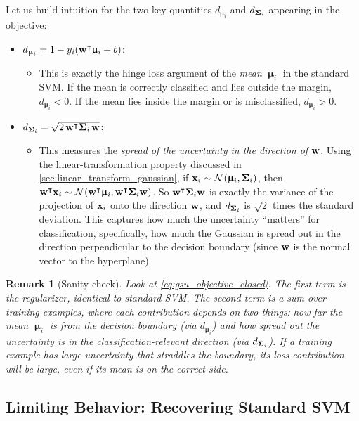 \documentclass[11pt, letterpaper]{article}
\newcommand{\bSigma}{\vb{\Sigma}}
\newcommand{\bmu}{\boldsymbol{\upmu}}
\newcommand{\Norm}{\mathcal{N}}
\newtheorem{remark}{Remark}[section]
\begin{document}
Let us build intuition for the two key quantities $d_{\bmu_i}$ and $d_{\bSigma_i}$ appearing in the objective:
\begin{itemize}
    \item $d_{\bmu_i} = 1 - y_i(\vb{w}^{\intercal} \bmu_i + b)$:
    \begin{itemize}
        \item This is exactly the hinge loss argument of the \emph{mean} $\bmu_i$ in the standard SVM. If the mean is correctly classified and lies outside the margin, $d_{\bmu_i} < 0$. If the mean lies inside the margin or is misclassified, $d_{\bmu_i} > 0$.
    \end{itemize}
    \item $d_{\bSigma_i} = \sqrt{2\, \vb{w}^{\intercal} \bSigma_i\, \vb{w}}$:
    \begin{itemize}
        \item This measures the \emph{spread of the uncertainty in the direction of $\vb{w}$}. Using the linear-transformation property discussed in \cref{sec:linear_transform_gaussian}, if $\vb{x}_i \sim \Norm(\bmu_i, \bSigma_i)$, then $\vb{w}^{\intercal}\vb{x}_i \sim \Norm(\vb{w}^{\intercal}\bmu_i, \vb{w}^{\intercal}\bSigma_i\vb{w})$. So $\vb{w}^{\intercal}\bSigma_i\vb{w}$ is exactly the variance of the projection of $\vb{x}_i$ onto the direction $\vb{w}$, and $d_{\bSigma_i}$ is $\sqrt{2}$ times the standard deviation. This captures how much the uncertainty ``matters'' for classification, specifically, how much the Gaussian is spread out in the direction perpendicular to the decision boundary (since $\vb{w}$ is the normal vector to the hyperplane).
    \end{itemize}
\end{itemize}

\begin{remark}[Sanity check]
Look at \cref{eq:gsu_objective_closed}. The first term is the regularizer, identical to standard SVM. The second term is a sum over training examples, where each contribution depends on two things: how far the mean $\bmu_i$ is from the decision boundary (via $d_{\bmu_i}$) and how spread out the uncertainty is in the classification-relevant direction (via $d_{\bSigma_i}$). If a training example has large uncertainty that straddles the boundary, its loss contribution will be large, even if its mean is on the correct side.
\end{remark}

\subsection{Limiting Behavior: Recovering Standard SVM}\label{sec:gsu_limit}
\end{document}
